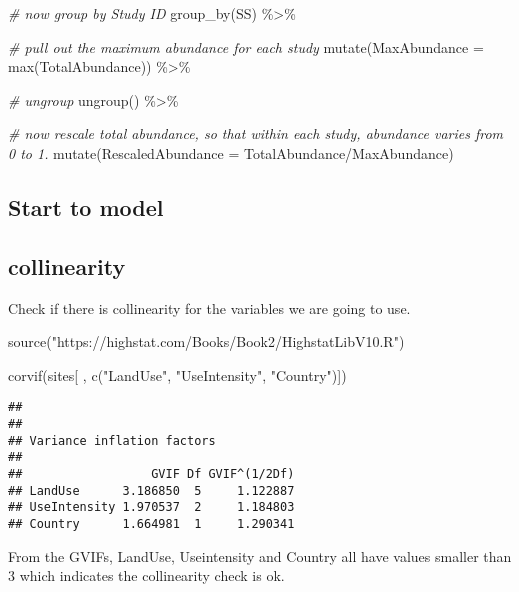 \documentclass[
]{article}
\newenvironment{Shaded}{\begin{snugshade}}{\end{snugshade}}
\newcommand{\AttributeTok}[1]{\textcolor[rgb]{0.77,0.63,0.00}{#1}}
\newcommand{\CommentTok}[1]{\textcolor[rgb]{0.56,0.35,0.01}{\textit{#1}}}
\newcommand{\FunctionTok}[1]{\textcolor[rgb]{0.00,0.00,0.00}{#1}}
\newcommand{\NormalTok}[1]{#1}
\newcommand{\SpecialCharTok}[1]{\textcolor[rgb]{0.00,0.00,0.00}{#1}}
\newcommand{\StringTok}[1]{\textcolor[rgb]{0.31,0.60,0.02}{#1}}
\begin{document}
\begin{Shaded}
\begin{Highlighting}[]
  \CommentTok{\# now group by Study ID}
  \FunctionTok{group\_by}\NormalTok{(SS) }\SpecialCharTok{\%\textgreater{}\%}
  
  \CommentTok{\# pull out the maximum abundance for each study}
  \FunctionTok{mutate}\NormalTok{(}\AttributeTok{MaxAbundance =} \FunctionTok{max}\NormalTok{(TotalAbundance)) }\SpecialCharTok{\%\textgreater{}\%}
  
  \CommentTok{\# ungroup}
  \FunctionTok{ungroup}\NormalTok{() }\SpecialCharTok{\%\textgreater{}\%}
  
  \CommentTok{\# now rescale total abundance, so that within each study, abundance varies from 0 to 1.}
  \FunctionTok{mutate}\NormalTok{(}\AttributeTok{RescaledAbundance =}\NormalTok{ TotalAbundance}\SpecialCharTok{/}\NormalTok{MaxAbundance)}
\end{Highlighting}
\end{Shaded}

\hypertarget{start-to-model}{%
\subsection{Start to model}\label{start-to-model}}

\hypertarget{collinearity}{%
\subsection{collinearity}\label{collinearity}}

Check if there is collinearity for the variables we are going to use.

\begin{Shaded}
\begin{Highlighting}[]
\FunctionTok{source}\NormalTok{(}\StringTok{"https://highstat.com/Books/Book2/HighstatLibV10.R"}\NormalTok{)}

\FunctionTok{corvif}\NormalTok{(sites[ , }\FunctionTok{c}\NormalTok{(}\StringTok{"LandUse"}\NormalTok{, }\StringTok{"UseIntensity"}\NormalTok{, }\StringTok{"Country"}\NormalTok{)])}
\end{Highlighting}
\end{Shaded}

\begin{verbatim}
## 
## 
## Variance inflation factors
## 
##                  GVIF Df GVIF^(1/2Df)
## LandUse      3.186850  5     1.122887
## UseIntensity 1.970537  2     1.184803
## Country      1.664981  1     1.290341
\end{verbatim}

From the GVIFs, LandUse, Useintensity and Country all have values
smaller than 3 which indicates the collinearity check is ok.
\end{document}
